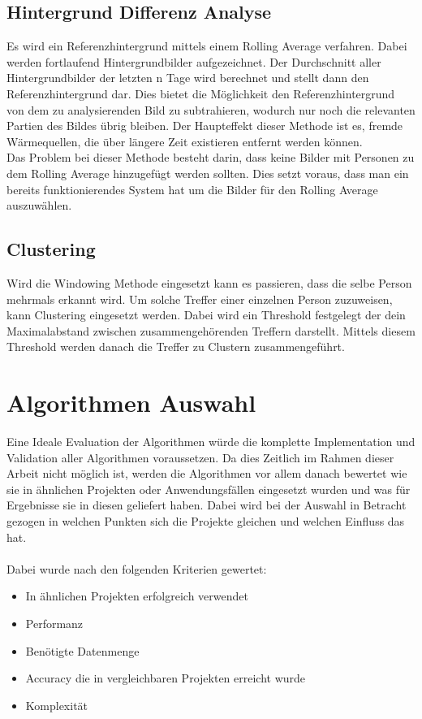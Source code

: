 \subsection{Hintergrund Differenz Analyse}

Es wird ein Referenzhintergrund mittels einem Rolling Average verfahren. Dabei werden fortlaufend Hintergrundbilder aufgezeichnet. Der Durchschnitt aller Hintergrundbilder der letzten n Tage wird berechnet und stellt dann den Referenzhintergrund dar. Dies bietet die Möglichkeit den Referenzhintergrund von dem zu analysierenden Bild zu subtrahieren, wodurch nur noch die relevanten Partien des Bildes übrig bleiben. Der Haupteffekt dieser Methode ist es, fremde Wärmequellen, die über längere Zeit existieren entfernt werden können.\\
Das Problem bei dieser Methode besteht darin, dass keine Bilder mit Personen zu dem Rolling Average hinzugefügt werden sollten. Dies setzt voraus, dass man ein bereits funktionierendes System hat um die Bilder für den Rolling Average auszuwählen.


\subsection{Clustering}

Wird die Windowing Methode eingesetzt kann es passieren, dass die selbe Person mehrmals erkannt wird. Um solche Treffer einer einzelnen Person zuzuweisen, kann Clustering eingesetzt werden. Dabei wird ein Threshold festgelegt der dein Maximalabstand zwischen zusammengehörenden Treffern darstellt. Mittels diesem Threshold werden danach die Treffer zu Clustern zusammengeführt.


\section{Algorithmen Auswahl}

Eine Ideale Evaluation der Algorithmen würde die komplette Implementation und Validation aller Algorithmen voraussetzen. Da dies Zeitlich im Rahmen dieser Arbeit nicht möglich ist, werden die Algorithmen vor allem danach bewertet wie sie in ähnlichen Projekten oder Anwendungsfällen eingesetzt wurden und was für Ergebnisse sie in diesen geliefert haben. Dabei wird bei der Auswahl in Betracht gezogen in welchen Punkten sich die Projekte gleichen und welchen Einfluss das hat.\\
\\
Dabei wurde nach den folgenden Kriterien gewertet:
\begin{itemize}
	\item In ähnlichen Projekten erfolgreich verwendet
	\item Performanz
	\item Benötigte Datenmenge
	\item Accuracy die in vergleichbaren Projekten erreicht wurde
	\item Komplexität
\end{itemize}

